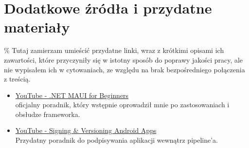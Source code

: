 \section{Dodatkowe źródła i przydatne materiały} \label{dodatkoweZrodla}
\% Tutaj zamierzam umieścić przydatne linki, wraz z krótkimi opisami ich zawartości,
które przyczyniły się w istotny sposób do poprawy jakości pracy, ale nie wypisałem ich w cytowaniach,
ze względu na brak bezpośredniego połączenia z treścią.

\begin{itemize}
    \item \href{https://www.youtube.com/playlist?list=PLdo4fOcmZ0oUBAdL2NwBpDs32zwGqb9DY}{YouTube - .NET MAUI for Beginners} \\
        oficjalny poradnik, który wstępnie oprowadził mnie po zastosowaniach i obsłudze frameworka.
    \item \href{https://www.youtube.com/watch?v=s1grtSSIRVA}{YouTube - Signing \& Versioning Android Apps} \\
        Przydatny poradnik do podpisywania aplikacji wewnątrz pipeline'a.
\end{itemize}

